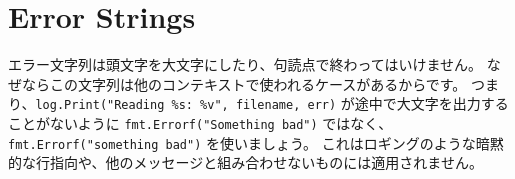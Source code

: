 \section{Error Strings}

エラー文字列は頭文字を大文字にしたり、句読点で終わってはいけません。 なぜならこの文字列は他のコンテキストで使われるケースがあるからです。 つまり、\texttt{log.Print("Reading \%s: \%v", filename, err)} が途中で大文字を出力することがないように \texttt{fmt.Errorf("Something bad")} ではなく、 \texttt{fmt.Errorf("something bad")} を使いましょう。 これはロギングのような暗黙的な行指向や、他のメッセージと組み合わせないものには適用されません。
